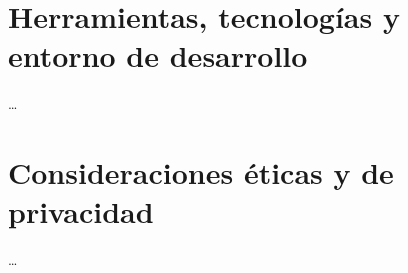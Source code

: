 \section{Herramientas, tecnologías y entorno de desarrollo}
\label{sec:herramientas}

\ldots

\section{Consideraciones éticas y de privacidad}
\label{sec:etica}

\ldots
